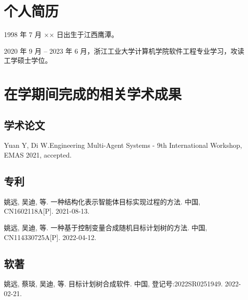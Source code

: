 
\begin{resume}

  \section*{个人简历}

  1998 年 7 月 ×× 日出生于江西鹰潭。

  2020 年 9 月 -- 2023 年 6 月，浙江工业大学计算机学院软件工程专业学习，攻读工学硕士学位。


  \section*{在学期间完成的相关学术成果}

  \subsection*{学术论文}

  \begin{achievements}
    \item Yuan Y, Di W.Engineering Multi-Agent Systems - 9th International Workshop, {EMAS}
    2021, accepted.
  \end{achievements}


  \subsection*{专利}

  \begin{achievements}
    \item 姚远, 吴迪, 等. 一种结构化表示智能体目标实现过程的方法. 中国, CN1602118A[P]. 2021-08-13.
    \item 姚远, 吴迪, 等. 一种基于控制变量合成随机目标计划树的方法. 中国, CN114330725A[P]. 2022-04-12.
  \end{achievements}

  \subsection*{软著}
  \begin{achievements}
  \item 姚远, 蔡琰, 吴迪, 等. 目标计划树合成软件. 中国, 登记号:2022SR0251949. 2022-02-21.
  \end{achievements}

\end{resume}
